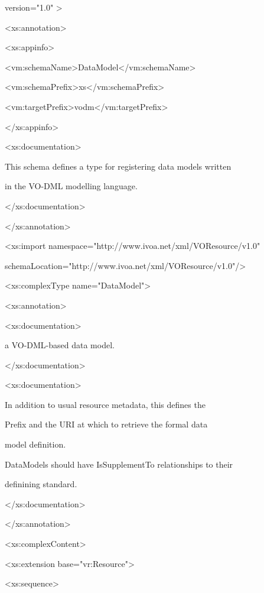 \documentclass[10pt,a4paper]{ivoa}
\begin{document}
version="1.0" \textgreater{}

\textless xs:annotation\textgreater{}

\textless xs:appinfo\textgreater{}

\textless vm:schemaName\textgreater DataModel\textless/vm:schemaName\textgreater{}

\textless vm:schemaPrefix\textgreater xs\textless/vm:schemaPrefix\textgreater{}

\textless vm:targetPrefix\textgreater vodm\textless/vm:targetPrefix\textgreater{}

\textless/xs:appinfo\textgreater{}

\textless xs:documentation\textgreater{}

This schema defines a type for registering data models written

in the VO-DML modelling language.

\textless/xs:documentation\textgreater{}

\textless/xs:annotation\textgreater{}

\textless xs:import namespace="http://www.ivoa.net/xml/VOResource/v1.0"

schemaLocation="http://www.ivoa.net/xml/VOResource/v1.0"/\textgreater{}

\textless xs:complexType name="DataModel"\textgreater{}

\textless xs:annotation\textgreater{}

\textless xs:documentation\textgreater{}

a VO-DML-based data model.

\textless/xs:documentation\textgreater{}

\textless xs:documentation\textgreater{}

In addition to usual resource metadata, this defines the

Prefix and the URI at which to retrieve the formal data

model definition.

DataModels should have IsSupplementTo relationships to their

definining standard.

\textless/xs:documentation\textgreater{}

\textless/xs:annotation\textgreater{}

\textless xs:complexContent\textgreater{}

\textless xs:extension base="vr:Resource"\textgreater{}

\textless xs:sequence\textgreater{}
\end{document}

